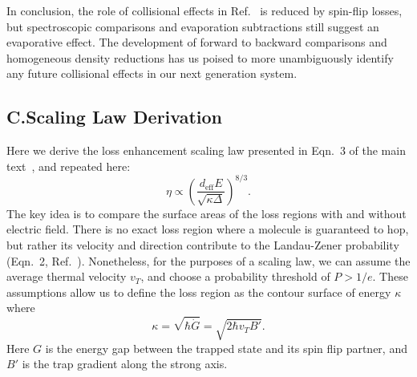 \documentclass[%
 reprint,
 amsmath,amssymb,
 aps,
prl,
]{revtex4-1}
\begin{document}

In conclusion, the role of collisional effects in Ref.~\cite{Stuhl2012evap} is reduced by spin-flip losses,
but spectroscopic comparisons and evaporation subtractions still suggest an evaporative effect. 
The development of forward to backward comparisons and homogeneous density reductions has us poised to more unambiguously identify any future collisional effects in our next generation system.

\subsection{C.\quad Scaling Law Derivation\label{sec:der}}

Here we derive the loss enhancement scaling law presented in Eqn.~3 of the main text~\cite{smt}, and repeated here:
\begin{equation}
\eta\propto \left(\frac{d_\text{eff}E}{\sqrt{\kappa\Delta}}\right)^{8/3}.
\end{equation}
The key idea is to compare the surface areas of the loss regions with and without electric field. 
There is no exact loss region where a molecule is guaranteed to hop, but rather its velocity and direction contribute to the Landau-Zener probability (Eqn.~2, Ref.~\cite{smt}).
Nonetheless, for the purposes of a scaling law, we can assume the average thermal velocity $v_T$, and choose a probability threshold of $P>1/e$.
These assumptions allow us to define the loss region as the contour surface of energy $\kappa$ where 
\begin{equation}
\kappa=\sqrt{\hbar\dot{G}}=\sqrt{2\hbar v_T B'}.
\end{equation} 
Here $G$ is the energy gap between the trapped state and its spin flip partner, and $B'$ is the trap gradient along the strong axis.
\end{document}
